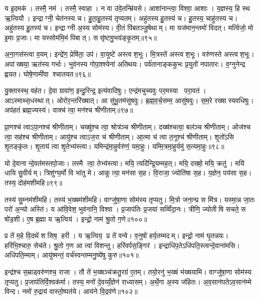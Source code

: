 य इ॒दमक॑। तस्मै॒ नम॑। तस्मै॒ स्वाहा। न वा उ॑वे॒तन्म्रि॑यसे। आशा॑नान्त्वा॒ विश्वा॒ आशाः। य॒ज्ञस्य॒ हि स्थ ऋ॒त्वियौ। इन्द्राग्नी॒ चेत॑नस्य च। हु॒ता॒हु॒तस्य॑ तृप्यतम्। अहु॑तस्य हु॒तस्य॑ च। हु॒तस्य॒ चाहु॑तस्य च। अहु॑तस्य हु॒तस्य॑ च। इन्द्राग्नी अ॒स्य सोम॑स्य। वी॒तं पि॑बतञ्जु॒षेथाम्। मा यज॑मान॒न्तमो॑ विदत्। मर्त्विजो॒ मो इ॒माः प्र॒जाः। मा यस्सोम॑मि॒मं पिबात्। ससृ॑ष्टमु॒भय॑ङ्कृ॒तम्॥९५॥\anuvakamend[कृ॒धि॒ मी॒ढुषेऽहु॑तस्य च स॒प्त च॑]

अ॒ना॒गस॑स्त्वा व॒यम्। इन्द्रे॑ण॒ प्रेषि॑ता॒ उप॑। वा॒युष्टे॑ अस्त्वश॒भूः। मि॒त्रस्ते॑ अस्त्वश॒भूः। वरु॑णस्ते अस्त्वश॒भूः। अपांख्षया॒ ऋत॑स्य गर्भाः। भुव॑नस्य गोपा॒श्श्येना॑ अतिथयः। पर्व॑तानाङ्ककुभः प्र॒युतो॑ नपातारः। व॒ग्नुनेन्द्र ह्वयत। घोषे॒णामी॑वा श्चातयत॥९६॥

यु॒क्तास्स्थ॒ वह॑त। दे॒वा ग्रावा॑ण॒ इन्दु॒रिन्द्र॒ इत्य॑वादिषुः। एन्द्र॑मचुच्यवुः पर॒मस्या परा॒वत॑। आऽस्माथ्स॒धस्थात्। ओरोर॒न्तरि॑ख्षात्। आ सु॑भू॒तम॑सुषवुः। ब्र॒ह्म॒व॒र्च॒सम्म॒ आसु॑षवुः। स॒म॒रे रख्षास्यवधिषुः। अप॑हतं ब्रह्म॒ज्यस्य॑। वाक्च॑ त्वा॒ मन॑श्च श्रीणीताम्॥९७॥

प्रा॒णश्च॑ त्वाऽपा॒नश्च॑ श्रीणीताम्। चख्षु॑श्च त्वा॒ श्रोत्र॑ञ्च श्रीणीताम्। दख्ष॑श्चत्वा॒ बल॑ञ्च श्रीणीताम्। ओज॑श्च त्वा॒ सह॑श्च श्रीणीताम्। आयु॑श्च त्वाऽज॒रा च॑ श्रीणीताम्। आ॒त्मा च॑ त्वा त॒नूश्च॑ श्रीणीताम्। शृ॒तो॑ऽसि शृ॒तङ्कृ॑तः। शृ॒ताय॑ त्वा शृ॒तेभ्य॑स्त्वा। यमिन्द्र॑मा॒हुर्वरु॑णं॒ यमा॒हुः। यम्मि॒त्रमा॒हुर्यमु॑ स॒त्यमा॒हुः॥९८॥

यो दे॒वानान्दे॒वत॑मस्तपो॒जाः। तस्मै त्वा॒ तेभ्य॑स्त्वा। मयि॒ त्यदि॑न्द्रि॒यम्मह॒त्। मयि॒ दख्षो॒ मयि॒ क्रतु॑। मयि॑ धायि सु॒वीर्यम्। त्रिशु॑ग्घ॒र्मो वि भा॑तु मे। आकूत्या॒ मन॑सा स॒ह। वि॒राजा॒ ज्योति॑षा स॒ह। य॒ज्ञेन॒ पय॑सा स॒ह। तस्य॒ दोह॑मशीमहि॥९९॥

तस्य॑ सु॒म्नम॑शीमहि। तस्य॑ भ॒ख्षम॑शीमहि। वाग्जु॑षा॒णा सोम॑स्य तृप्यतु। मि॒त्रो जना॒न्प्र स मि॑त्र। यस्मा॒न्न जा॒तः परो॑ अ॒न्यो अस्ति॑। य आ॑वि॒वेश॒ भुव॑नानि॒ विश्वा। प्र॒जाप॑तिः प्र॒जया॑ सव्विँदा॒नः। त्रीणि॒ ज्योतीषि सचते॒ स षो॑ड॒शी। ए॒ष ब्र॒ह्मा य ऋ॒त्विय॑। इन्द्रो॒ नाम॑ श्रु॒तो ग॒णे॥१००॥

प्र ते॑ म॒हे वि॒दथे॑ शसिष॒ हरी। य ऋ॒त्विय॒ प्र ते॑ वन्वे। व॒नुषो॑ हर्य॒तम्मदम्। इन्द्रो॒ नाम॑ घृ॒तन्नयः। हरि॑भि॒श्चारु॒ सेच॑ते। श्रु॒तो ग॒ण आ त्वा॑ विशन्तु। हरि॑वर्पस॒ङ्गिर॑। इन्द्राधि॑प॒तेऽधि॑पति॒स्त्वन्दे॒वाना॑मसि। अधि॑पति॒म्माम्। आयु॑ष्मन्तं॒ वर्च॑स्वन्तम्मनु॒ष्ये॑षु कुरु॥१०१॥

इन्द्र॑श्च स॒म्राड्वरु॑णश्च॒ राजा। तौ ते॑ भ॒ख्षञ्च॑क्रतु॒रग्र॑ ए॒तम्। तयो॒रनु॑ भ॒ख्षं भ॑ख्षयामि। वाग्जु॑षा॒णा सोम॑स्य तृप्यतु। प्र॒जाप॑तिर्वि॒श्वक॑र्मा। तस्य॒ मनो॑ दे॒वय्यँ॒ज्ञेन॑ राध्यासम्। अ॒र्थे॒गा अ॒स्य ज॑हितः। अ॒व॒सान॑पतेऽव॒सान॑म्मे विन्द। नमो॑ रु॒द्राय॑ वास्तो॒ष्पत॑ये। आय॑ने वि॒द्रव॑णे॥१०२॥

